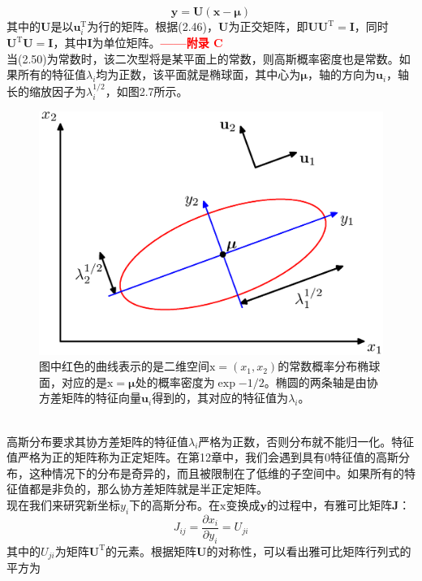 \documentclass[b5paper]{book}
\numberwithin{equation}{chapter}
\newcommand {\bx} {\boldsymbol{\mathrm{x}}}
\newcommand {\rmT} {\mathrm{T}}
\newcommand {\bfMu} {\boldsymbol{\mu}}
\begin{document}
{\begin{equation}
		\mathbf{y}=\mathbf{U}(\mathbf{x}-\bfMu)
	\end{equation}
	其中的$\mathbf{U}$是以$\mathbf{u}_i^{\rmT}$为行的矩阵。根据(2.46)，$\mathbf{U}$为正交矩阵，即$\mathbf{U}\mathbf{U}^{\rmT}=\mathbf{I}$，同时$\mathbf{U}^{\rmT}\mathbf{U}=\mathbf{I}$，其中$\mathbf{I}$为单位矩阵。\textcolor{red}{\textbf{——附录 C} \ }\\
	\indent 当(2.50)为常数时，该二次型将是某平面上的常数，则高斯概率密度也是常数。如果所有的特征值$\lambda_i$均为正数，该平面就是椭球面，其中心为$\bfMu$，轴的方向为$\mathbf{u}_i$，轴长的缩放因子为$\lambda_i^{1/2}$，如图2.7所示。
	\begin{figure}[ht]
		\centering
		\includegraphics[scale=0.8]{Images/2-7.png}
		\caption{图中红色的曲线表示的是二维空间$\bx=(x_1,x_2)$的常数概率分布椭球面，对应的是$\bx=\bfMu$处的概率密度为$\exp{-1/2}$。椭圆的两条轴是由协方差矩阵的特征向量$\mathbf{u}_i$得到的，其对应的特征值为$\lambda_i$。}
		\label{fig:2-7}
	\end{figure}
	\\
	\indent 高斯分布要求其协方差矩阵的特征值$\lambda_i$严格为正数，否则分布就不能归一化。特征值严格为正的矩阵称为正定矩阵。在第12章中，我们会遇到具有0特征值的高斯分布，这种情况下的分布是奇异的，而且被限制在了低维的子空间中。如果所有的特征值都是非负的，那么协方差矩阵就是半正定矩阵。\\
	\indent 现在我们来研究新坐标$y_i$下的高斯分布。在$\bx$变换成$\mathbf{y}$的过程中，有雅可比矩阵$\mathbf{J}$：
	\begin{equation}
		J_{ij}=\frac{\partial x_i}{\partial y_i}=U_{ji}
	\end{equation}
	其中的$U_{ji}$为矩阵$\mathbf{U}^{\rmT}$的元素。根据矩阵$\mathbf{U}$的对称性，可以看出雅可比矩阵行列式的平方为
}
\end{document}
